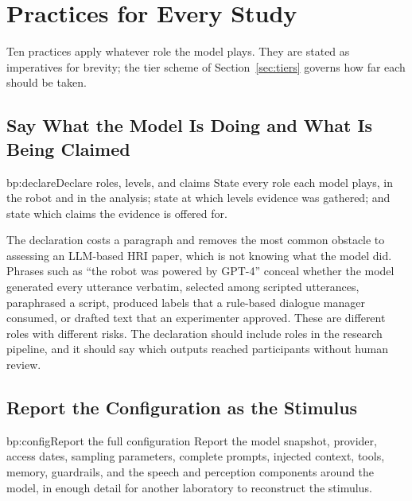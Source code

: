 \section{Practices for Every Study}
\label{sec:crosscutting}

Ten practices apply whatever role the model plays. They are stated as
imperatives for brevity; the tier scheme of Section~\ref{sec:tiers} governs
how far each should be taken.

\subsection{Say What the Model Is Doing and What Is Being Claimed}

\begin{practice}{bp:declare}{Declare roles, levels, and claims}
State every role each model plays, in the robot and in the analysis; state at
which levels evidence was gathered; and state which claims the evidence is
offered for.
\end{practice}

The declaration costs a paragraph and removes the most common obstacle to
assessing an LLM-based HRI paper, which is not knowing what the model did.
Phrases such as ``the robot was powered by GPT-4'' conceal whether the model
generated every utterance verbatim, selected among scripted utterances,
paraphrased a script, produced labels that a rule-based dialogue manager
consumed, or drafted text that an experimenter approved. These are different
roles with different risks. The declaration should include roles in the
research pipeline, and it should say which outputs reached participants
without human review.

\subsection{Report the Configuration as the Stimulus}

\begin{practice}{bp:config}{Report the full configuration}
Report the model snapshot, provider, access dates, sampling parameters,
complete prompts, injected context, tools, memory, guardrails, and the speech
and perception components around the model, in enough detail for another
laboratory to reconstruct the stimulus.
\end{practice}

